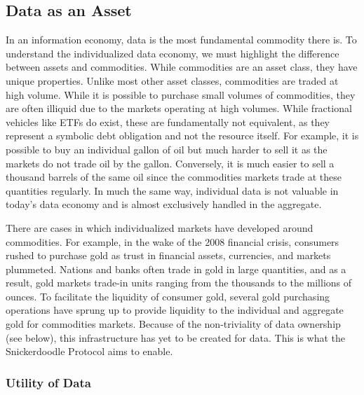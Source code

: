 \subsection{Data as an Asset}
In an information economy, data is the most fundamental commodity there is. To understand the individualized data economy, we must highlight the difference between assets 
and commodities. While commodities are an asset class, they have unique properties. Unlike most other asset classes, commodities are traded at high volume. While it is 
possible to purchase small volumes of commodities, they are often illiquid due to the markets operating at high volumes. While fractional vehicles like ETFs do exist, 
these are fundamentally not equivalent, as they represent a symbolic debt obligation and not the resource itself. For example, it is possible to buy 
an individual gallon of oil but much harder to sell it as the markets do not trade oil by the gallon. Conversely, it is much easier to sell a thousand barrels of the 
same oil since the commodities markets trade at these quantities regularly. In much the same way, individual data is not valuable in today's data economy and is almost 
exclusively handled in the aggregate.

There are cases in which individualized markets have developed around commodities. For example, in the wake of the 2008 financial crisis, consumers rushed to purchase gold 
as trust in financial assets, currencies, and markets plummeted. Nations and banks often trade in gold in large quantities, and as a result, gold markets trade-in units 
ranging from the thousands to the millions of ounces. To facilitate the liquidity of consumer gold, several gold purchasing operations have sprung up to provide liquidity to the 
individual and aggregate gold for commodities markets. Because of the non-triviality of data ownership (see below), this infrastructure has yet to be created for data. 
This is what the Snickerdoodle Protocol aims to enable.


\subsubsection{Utility of Data}


